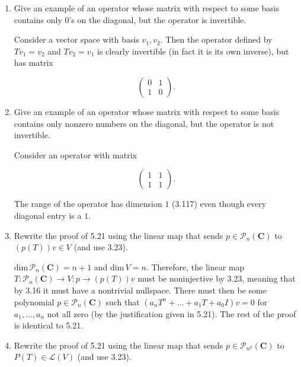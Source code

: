 \documentclass{book}
\begin{document}
\begin{enumerate}
\item Give an example of an operator whose matrix with respect to some basis contains only \(0\)'s on the diagonal, but the operator is invertible.

Consider a vector space with basis \(v_1,v_2\).  Then the operator defined by \(Tv_1=v_2\) and \(Tv_2=v_1\) is clearly invertible (in fact it is its own inverse), but has matrix

\begin{equation*}
    \begin{pmatrix}
        0 & 1 \\
        1 & 0
    \end{pmatrix}.
\end{equation*}

\item Give an example of an operator whose matrix with respect to some basis contains only nonzero numbers on the diagonal, but the operator is not invertible.

Consider an operator with matrix

\begin{equation*}
    \begin{pmatrix}
        1 & 1 \\
        1 & 1
    \end{pmatrix}.
\end{equation*}

The range of the operator has dimension \(1\) (3.117) even though every diagonal entry is a \(1\).

\item Rewrite the proof of 5.21 using the linear map that sends \(p \in \mathcal{P}_n(\textbf{C})\) to \((p(T))v \in V\) (and use 3.23).

\(\text{dim} \, \mathcal{P}_n(\textbf{C})=n+1\) and \(\text{dim} \, V = n\).  Therefore, the linear map \(T:\mathcal{P}_n(\textbf{C}) \rightarrow V:p \rightarrow (p(T))v\) must be noninjective by 3.23, meaning that by 3.16 it must have a nontrivial nullspace.  There must then be some polynomial \(p \in \mathcal{P}_n(\textbf{C})\) such that \((a_nT^n+\dots+a_1T+a_0I)v=0\) for \(a_1,\dots,a_n\) not all zero (by the justification given in 5.21).  The rest of the proof is identical to 5.21.

\item Rewrite the proof of 5.21 using the linear map that sends \(p \in \mathcal{P}_{n^2}(\textbf{C})\) to \(P(T) \in \mathcal{L}(V)\) (and use 3.23).


\end{enumerate}
\end{document}
